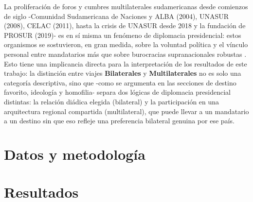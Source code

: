 \documentclass[11pt,a4paper]{article}
\begin{document}
La proliferaci\'on de foros y cumbres multilaterales sudamericanas desde comienzos de siglo -Comunidad Sudamericana de Naciones y ALBA (2004), UNASUR (2008), CELAC (2011), hasta la crisis de UNASUR desde 2018 y la fundaci\'on de PROSUR (2019)- es en s\'i misma un fen\'omeno de diplomacia presidencial: estos organismos se sostuvieron, en gran medida, sobre la voluntad pol\'itica y el v\'inculo personal entre mandatarios m\'as que sobre burocracias supranacionales robustas \citep{malamudDiplomaciaPresidencialPilares2010, penaComplejaRedCumbres2005, nolteSummitsPlainsCrisis2021}. Esto tiene una implicancia directa para la interpretaci\'on de los resultados de este trabajo: la distinci\'on entre viajes \textbf{Bilaterales} y \textbf{Multilaterales} no es solo una categor\'ia descriptiva, sino que -como se argumenta en las secciones de destino favorito, ideolog\'ia y homofilia- separa dos l\'ogicas de diplomacia presidencial distintas: la relaci\'on diádica elegida (bilateral) y la participaci\'on en una arquitectura regional compartida (multilateral), que puede llevar a un mandatario a un destino sin que eso refleje una preferencia bilateral genuina por ese pa\'is.

\section{Datos y metodolog\'ia}

\section{Resultados}
\end{document}
